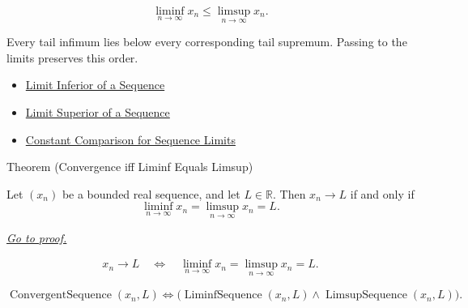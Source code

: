\begin{remark*}
\[
\liminf_{n\to\infty}x_n\le \limsup_{n\to\infty}x_n.
\]
\end{remark*}

\begin{remark*}[Interpretation]
Every tail infimum lies below every corresponding tail supremum. Passing to
the limits preserves this order.
\end{remark*}

\begin{remark*}[Dependencies]\hfill
\begin{itemize}
  \item \hyperref[def:liminf-sequence]{Limit Inferior of a Sequence}
  \item \hyperref[def:limsup-sequence]{Limit Superior of a Sequence}
  \item \hyperref[thm:constant-comparison-for-sequence-limits]{Constant Comparison for Sequence Limits}
\end{itemize}
\end{remark*}


\begin{theorembox}{Theorem (Convergence iff Liminf Equals Limsup)}
\begin{theorem}
\label{thm:convergence-iff-liminf-equals-limsup}
Let $(x_n)$ be a bounded real sequence, and let $L\in\mathbb{R}$. Then
$x_n\to L$ if and only if
\[
  \liminf_{n\to\infty}x_n
  =
  \limsup_{n\to\infty}x_n
  =
  L.
\]

\smallskip
\noindent
\hyperref[prf:convergence-iff-liminf-equals-limsup]{\textit{Go to proof.}}
\end{theorem}
\end{theorembox}

\begin{remark*}
\[
\begin{aligned}
x_n\to L
\quad\Longleftrightarrow\quad
\liminf_{n\to\infty}x_n
=
\limsup_{n\to\infty}x_n
=L.
\end{aligned}
\]
\end{remark*}

\begin{remark*}
\[
\operatorname{ConvergentSequence}(x_n,L)
\Longleftrightarrow
\bigl(
  \operatorname{LiminfSequence}(x_n,L)
  \land
  \operatorname{LimsupSequence}(x_n,L)
\bigr).
\]
\end{remark*}

